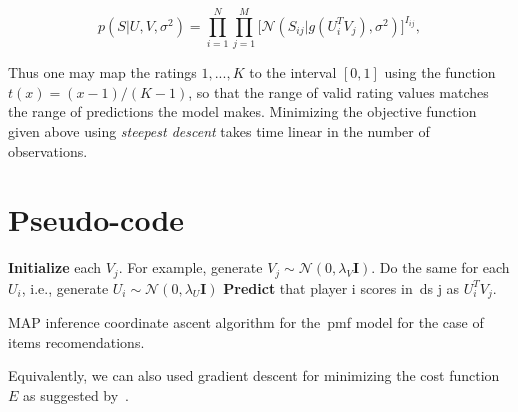 \begin{equation}
p(S|U,V,\sigma^{2}) = \prod_{i=1}^{N}\prod_{j=1}^{M} \Bigg[ \mathcal{N}(S_{ij}|g(U^{T}_{i}V_{j}),\sigma^{2}) \Bigg]^{I_{ij}},
\end{equation}

Thus one may map the ratings $1, ..., K$ to the interval $[0, 1]$ using the function $t(x) = (x - 1)/(K - 1)$, so that the range of valid rating values matches the range of predictions the model makes. Minimizing the objective function given above using \textit{steepest descent} takes time linear in the number of observations.

\section{Pseudo-code}
\begin{center}
\begin{algorithm}[H]
 \textbf{Initialize} each $V_{j}$. For example, generate $V_{j} \sim \mathcal{N}(0, \lambda_{V}\boldsymbol{I})$. Do the same for each $U_{i}$, i.e., generate $U_{i} \sim \mathcal{N}(0, \lambda_{U}\boldsymbol{I})$\;
 \textbf{Predict} that player i scores in~\gls{ds} j as $U_{i}^{T}V_j$.
 \caption{MAP inference coordinate ascent algorithm for the~\gls{pmf} model for the case of items recomendations.}
\end{algorithm}
\end{center}

Equivalently, we can also used gradient descent for minimizing the cost function $E$ as suggested by~\cite{mnih_probabilistic_2008}.